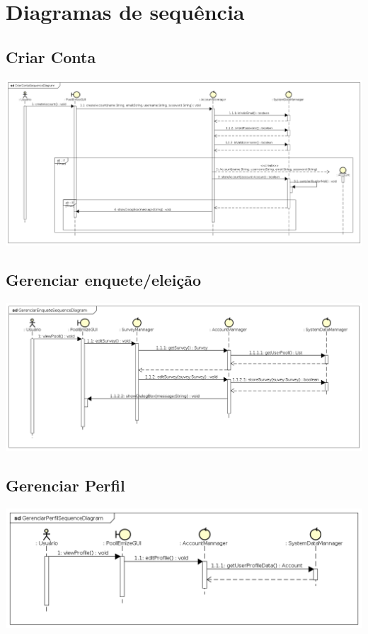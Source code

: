 \documentclass[a4paper,12pt]{report}
\begin{document}
\section*{Diagramas de sequência}
\markright{}

\subsection*{Criar Conta}
\markright{}
\includegraphics[width=14.3cm]{sequence_diagrams/CriarContaSequenceDiagram.png}

\subsection*{Gerenciar enquete/eleição}
\markright{}
\includegraphics[width=14.3cm]{sequence_diagrams/GerenciarEnqueteSequenceDiagram.png}

\subsection*{Gerenciar Perfil}
\markright{}
\includegraphics[width=14.3cm]{sequence_diagrams/GerenciarPerfilSequenceDiagram.png}
\end{document}
